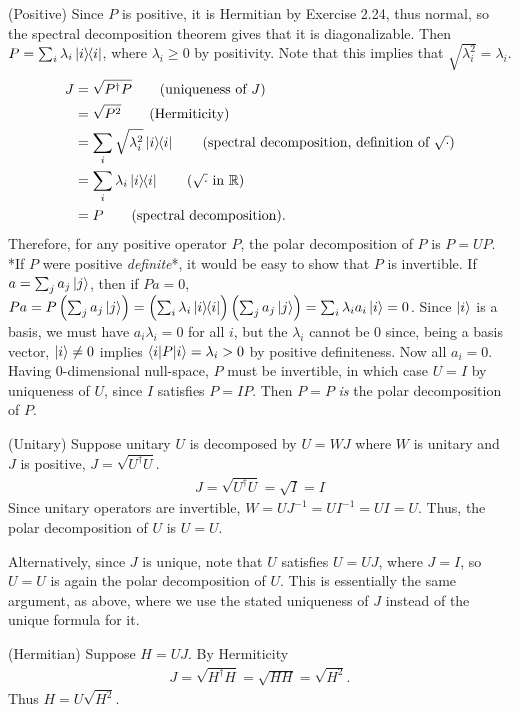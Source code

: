 (Positive)  Since $P$ is positive, it is Hermitian by Exercise 2.24, thus normal, so the spectral decomposition theorem gives that it is diagonalizable. Then $P = \sum_i \lambda_i \ket{i}\hspace{-1mm} \bra{i}$,  where $\lambda_i \geq 0$ by positivity. Note that this implies that $\sqrt{\lambda_i^2}=\lambda_i$.
\begin{align*}
	J &= \sqrt{P^\dagger P} \tag{uniqueness of $J$}\\
	&= \sqrt{P^2} \tag{Hermiticity}\\
	&= \sum_i \sqrt{\lambda_i^2} \kb{i} \tag{spectral decomposition, definition of $\sqrt{\cdot}$}\\
	&= \sum_i \lambda_i \kb{i} \tag{$\sqrt{\cdot}$ in $\mathbb{R}$}\\
	& = P \tag{spectral decomposition}.
\end{align*}
Therefore, for any positive operator $P$, the polar decomposition of $P$ is $P = UP$.  *If $P$ were positive \textit{definite}*, it would be easy to show that $P$ is invertible.  If $a=\sum_j a_j\ket{j}$, then if $Pa = 0$, $Pa = P\left(\sum_j a_j\ket{j}\right) = \Bigl(\sum_i \lambda_i \ket{i}\hspace{-1mm} \bra{i}\Bigr)\left(\sum_j a_j\ket{j}\right) = \sum_i \lambda_i a_i \ket{i} = 0$. Since $\ket{i}$ is a basis, we must have $a_i\lambda_i=0$ for all $i$, but the $\lambda_i$ cannot be 0 since, being a basis vector, $\ket{i}\neq 0$ implies $\braket{i|P|i} =\lambda_i >0$ by positive definiteness.  Now all $a_i = 0$.  Having 0-dimensional null-space, $P$ must be invertible, in which case $U=I$ by uniqueness of $U$, since $I$ satisfies $P = IP$. Then $P = P$ \textit{is} the polar decomposition of $P$.



\vspace{3mm}(Unitary) Suppose unitary $U$ is decomposed by $U = WJ$ where $W$ is unitary and $J$ is positive, $J = \sqrt{U^\dagger U}$.
\begin{align*}
	J = \sqrt{U^\dagger U} = \sqrt{I} = I
\end{align*}
Since unitary operators are invertible, $W = UJ^{-1} = UI^{-1} = UI = U$.
Thus, the polar decomposition of $U$ is $U = U$.

Alternatively, since $J$ is unique, note that $U$ satisfies $U=UJ$, where $J=I$, so $U=U$ is again the polar decomposition of $U$.  This is essentially the same argument, as above, where we use the stated uniqueness of $J$ instead of the unique formula for it.

\vspace{3mm}
(Hermitian) Suppose $H = UJ$.  By Hermiticity
\begin{align*}
	J = \sqrt{H^\dagger H} = \sqrt{HH} = \sqrt{H^2}.
\end{align*}
Thus $H = U\sqrt{H^2}$.

